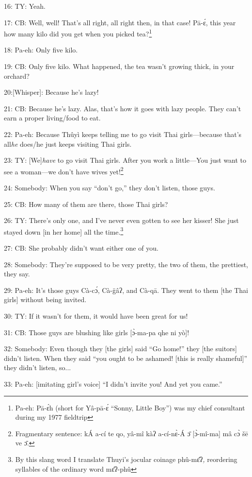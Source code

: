 16: TY: Yeah.

17: CB: Well, well!  That's all right, all right then, in that case!  Pā-ɛ́,
this year how many kilo did you get when you picked tea?\footnote{Pa-eh: Pā-ɛ́h (short for Yâ-pā-ɛ́ ``Sonny, Little Boy'') was my chief consultant during my 1977 fieldtrip}

18: Pa-eh: Only five kilo.

19: CB: Only five kilo.  What happened, the tea wasn't growing thick, in your orchard?

20:[Whisper]: Because he's lazy!

21: CB: Because he's lazy.  Alas, that's how it goes with lazy people.  They can't
earn a proper living/food to eat.

22: Pa-eh: Because Thûyì keeps telling me to go visit Thai girls---because that's
all\textit{he} does/he just keeps visiting Thai girls.

23: TY: [We]\textit{have} to go visit Thai girls.  After you work a little---You
just want to see a woman---we don't have wives yet!\footnote{Fragmentary sentence: kÁ a-cí te qo, yâ-mî kàʔ a-cí-nɛ̀-Á ɔ̄ [ɔ̀-mî-ma] mâ cɔ̀ šē ve ɔ̄.}

24: Somebody: When you say ``don't go,'' they don't listen, those guys.

25: CB: How many of them are there, those Thai girls?

26: TY: There's only one, and I've never even gotten to see her kisser! She just
stayed down [in her home] all the time.\footnote{By this slang word I translate Thuyi's jocular coinage phû-mɛ̂ʔ\textit{,} reordering syllables of the ordinary word mɛ̂ʔ-phû}

27: CB: She probably didn't want either one of you.

28: Somebody: They're supposed to be very pretty, the two of them, the prettiest,
they say.

29: Pa-eh: It's those guys Cà-cɔ́, Cà-g̈âʔ, and Cà-qā.  They went to
them [the Thai girls] without being invited.

30: TY: If it wasn't for them, it would have been great for us!

31: CB: Those guys are blushing like girls [ɔ̀-ma-pa qhe ni yò]!

32: Somebody: Even though they [the girls] said ``Go home!'' they [the suitors]
didn't listen.  When they said ``you ought to be ashamed! [this is really shameful]''
they didn't listen, so...

33: Pa-eh: [imitating girl's voice] ``I didn't invite you!  And yet you came.''


